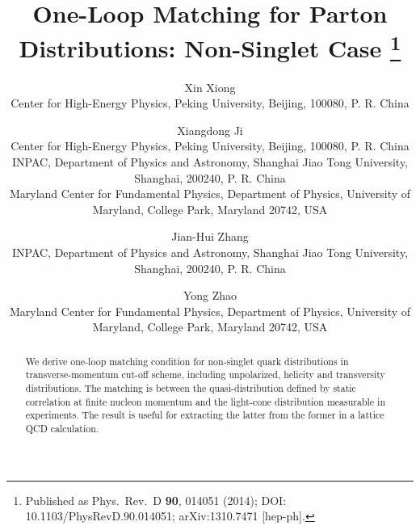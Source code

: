 \documentclass[11pt]{article}
\begin{document}
\title{One-Loop Matching for Parton Distributions: Non-Singlet Case%
\thanks{Published as Phys.\ Rev.\ D {\bf 90}, 014051 (2014);
DOI: 10.1103/PhysRevD.90.014051; arXiv:1310.7471 [hep-ph].}}
\author{
Xin Xiong\\
{\small Center for High-Energy Physics, Peking University, Beijing, 100080, P. R. China}\\[3pt]
\and
Xiangdong Ji\\
{\small Center for High-Energy Physics, Peking University, Beijing, 100080, P. R. China}\\
{\small INPAC, Department of Physics and Astronomy, Shanghai Jiao Tong University, Shanghai, 200240, P. R. China}\\
{\small Maryland Center for Fundamental Physics, Department of Physics, University of Maryland, College Park, Maryland 20742, USA}\\[3pt]
\and
Jian-Hui Zhang\\
{\small INPAC, Department of Physics and Astronomy, Shanghai Jiao Tong University, Shanghai, 200240, P. R. China}\\[3pt]
\and
Yong Zhao\\
{\small Maryland Center for Fundamental Physics, Department of Physics, University of Maryland, College Park, Maryland 20742, USA}
}

\date{}

\begin{abstract}
We derive one-loop matching condition for non-singlet quark distributions in transverse-momentum cut-off scheme, including unpolarized, helicity and transversity distributions. The matching is between
the quasi-distribution defined by static correlation at finite nucleon momentum and the light-cone distribution
measurable in experiments. The result is useful for extracting the latter from the former in a lattice QCD calculation.
\end{abstract}

\maketitle







\end{document}
